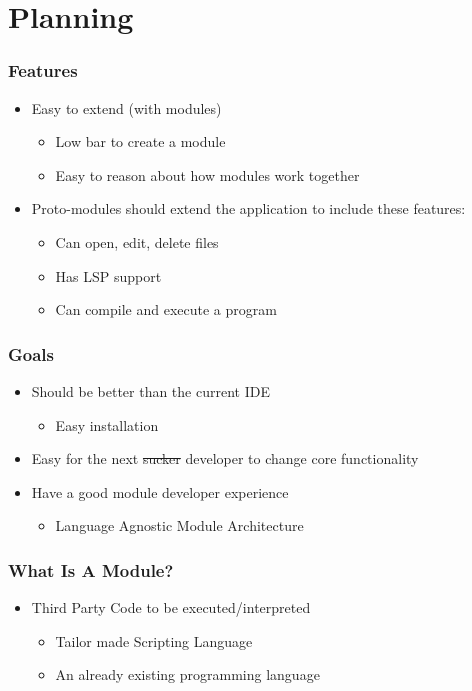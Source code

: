 \section{Planning}
\SectionPage

\begin{frame}
  \frametitle{Features}
  \begin{itemize}
    \item Easy to extend (with modules)
      \begin{itemize}
        \item Low bar to create a module
        \item Easy to reason about how modules work together
      \end{itemize}
    \item Proto-modules should extend the application to include these features:
      \begin{itemize}
        \item Can open, edit, delete files
        \item Has LSP support
        \item Can compile and execute a program
      \end{itemize}
  \end{itemize}
\end{frame}

\begin{frame}
  \frametitle{Goals}
  \begin{itemize}
    \item Should be better than the current IDE
      \begin{itemize}
        \item Easy installation
      \end{itemize}
    \item Easy for the next \sout{sucker} developer to change core functionality
    \item Have a good module developer experience
      \begin{itemize}
        \item Language Agnostic Module Architecture
      \end{itemize}
  \end{itemize}
\end{frame}

\begin{frame}
  \frametitle{What Is A Module?}
  \begin{itemize}
    \item Third Party Code to be executed/interpreted
      \begin{itemize}
        \item Tailor made Scripting Language
        \item An already existing programming language
      \end{itemize}
  \end{itemize}
\end{frame}

